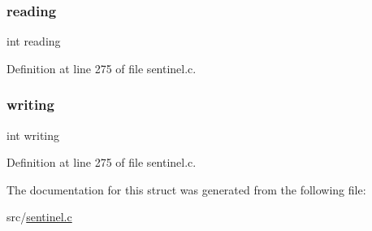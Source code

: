 \subsubsection{\texorpdfstring{reading}{reading}}
{\footnotesize\ttfamily int reading}



Definition at line 275 of file sentinel.\+c.

\mbox{\label{structredis_ae_events_adb2dbc8c43288a024535ed507da7b278}} 
\subsubsection{\texorpdfstring{writing}{writing}}
{\footnotesize\ttfamily int writing}



Definition at line 275 of file sentinel.\+c.



The documentation for this struct was generated from the following file\+:\begin{DoxyCompactItemize}
\item 
src/\hyperlink{sentinel_8c}{sentinel.\+c}\end{DoxyCompactItemize}
